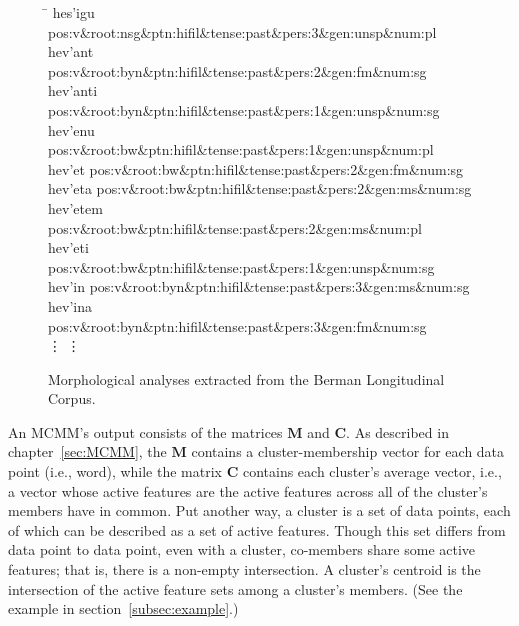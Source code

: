 \begin{figure}[t]
\begin{mdframed}
\begin{tabbing}
\hspace{1in} \= \hspace{5.5in} \kill
hes\a'{i}gu \> pos:v\&root:nsg\&ptn:hifil\&tense:past\&pers:3\&gen:unsp\&num:pl \\
hev\a'{a}nt \> pos:v\&root:byn\&ptn:hifil\&tense:past\&pers:2\&gen:fm\&num:sg \\
hev\a'{a}nti \> pos:v\&root:byn\&ptn:hifil\&tense:past\&pers:1\&gen:unsp\&num:sg \\
hev\a'{e}nu \> pos:v\&root:bw\&ptn:hifil\&tense:past\&pers:1\&gen:unsp\&num:pl \\
hev\a'{e}t \> pos:v\&root:bw\&ptn:hifil\&tense:past\&pers:2\&gen:fm\&num:sg \\
hev\a'{e}ta \> pos:v\&root:bw\&ptn:hifil\&tense:past\&pers:2\&gen:ms\&num:sg \\
hev\a'{e}tem \> pos:v\&root:bw\&ptn:hifil\&tense:past\&pers:2\&gen:ms\&num:pl \\
hev\a'{e}ti \> pos:v\&root:bw\&ptn:hifil\&tense:past\&pers:1\&gen:unsp\&num:sg \\
hev\a'{i}n \> pos:v\&root:byn\&ptn:hifil\&tense:past\&pers:3\&gen:ms\&num:sg \\
hev\a'{i}na \> pos:v\&root:byn\&ptn:hifil\&tense:past\&pers:3\&gen:fm\&num:sg \\
\vdots \> \vdots \\
\end{tabbing}
\caption{Morphological analyses extracted from the Berman Longitudinal Corpus.}
\label{fig:analyses}
\end{mdframed}
\end{figure}


An MCMM's output consists of 
the matrices $\mathbf{M}$ and $\mathbf{C}$. As described in chapter~\ref{sec:MCMM}, the $\mathbf{M}$ contains a cluster-membership vector for each data point (i.e., word), while the matrix $\mathbf{C}$ contains each cluster's average vector, i.e., a vector whose active features are the active features across all of the cluster's members have in common. Put another way, a cluster is a set of data points, each of which can be described as a set of active features. Though this set differs from data point to data point, even with a cluster, co-members share some active features; that is, there is a non-empty intersection.  A cluster's centroid is the intersection of the active feature sets among a cluster's members.
(See the example in section~\ref{subsec:example}.) 

